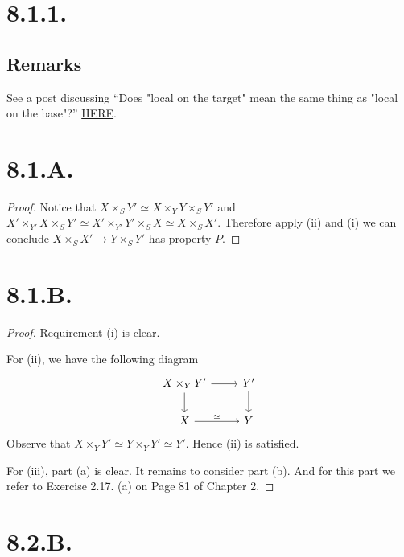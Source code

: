 \section{8.1.1.}

\subsection{Remarks}
See a post discussing \enquote{Does "local on the target" mean the same thing as "local on the base"?} \href{https://math.stackexchange.com/questions/2767806/does-local-on-the-target-mean-the-same-thing-as-local-on-the-base}{HERE}.

\section{8.1.A.}

\begin{proof}
Notice that $X\times_S Y'\simeq X\times_Y Y\times_S Y'$ and $X'\times_{Y'} X\times_S Y'\simeq X'\times_{Y'}Y'\times_S X\simeq X\times_S X'$. Therefore apply (ii) and (i) we can conclude $X\times_S X'\to Y\times_S Y'$ has property $P$.
\end{proof}


\section{8.1.B.}

\begin{proof}
    Requirement (i) is clear. 
    
    For (ii), we have the following diagram %
\[\begin{tikzcd}
	{X\times_Y Y'} & {Y'} \\
	X & Y
	\arrow[from=1-1, to=1-2]
	\arrow[from=1-1, to=2-1]
	\arrow[from=1-2, to=2-2]
	\arrow["\simeq", from=2-1, to=2-2]
\end{tikzcd}\]
Observe that $X\times_Y Y'\simeq Y\times_Y Y'\simeq Y'$. Hence (ii) is satisfied. 

For (iii), part (a) is clear. It remains to consider part (b). And for this part we refer to \cite{hartshorne2013algebraic} Exercise 2.17. (a) on Page 81 of Chapter 2. 
\end{proof}

\section{8.2.B.}
